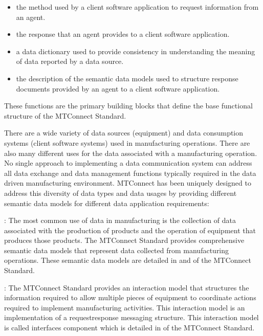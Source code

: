 \begin{itemize}

\item the method used by a client software application to request information from an \gls{agent}.

\item the response that an \gls{agent} provides to a client software application.

\item a \gls{data dictionary} used to provide consistency in understanding the meaning of data reported by a data source.

\item the description of the \glspl{semantic data model} used to structure \glspl{response document} provided by an \gls{agent} to a client software application.

\end{itemize}

These functions are the primary building blocks that define the \gls{base functional structure} of the MTConnect Standard.

There are a wide variety of data sources (equipment) and data consumption systems (client software systems) used in manufacturing operations.  There are also many different uses for the data associated with a manufacturing operation.  No single approach to implementing a data communication system can address all data exchange and data management functions typically required in the data driven manufacturing environment.  MTConnect has been uniquely designed to address this diversity of data types and data usages by providing different \glspl{semantic data model} for different data application requirements:

: The most common use of data in manufacturing is the collection of data associated with the production of products and the operation of equipment that produces those products.  The MTConnect Standard provides comprehensive \glspl{semantic data model} that represent data collected from manufacturing operations.  These \glspl{semantic data model} are detailed in  and  of the MTConnect Standard.

:  The MTConnect Standard provides an \gls{interaction model} that structures the information required to allow multiple pieces of equipment to coordinate actions required to implement manufacturing activities.  This \gls{interaction model} is an implementation of a \gls{requestresponse}  messaging structure.  This \gls{interaction model} is called \gls{interfaces component} which is detailed in  of the MTConnect Standard.

